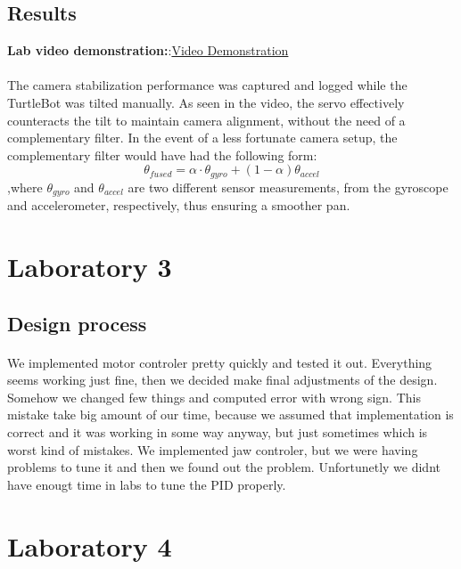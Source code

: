 \documentclass[english]{article}
\begin{document}
    \subsection{Results}
    \textbf{Lab video demonstration:}:\href{https://youtube.com/shorts/imY0JJ4vP6Q?feature=share}{Video Demonstration}
    \paragraph{}
    The camera stabilization performance was captured and logged while the TurtleBot was tilted manually. As seen in the video, the servo effectively counteracts the tilt to maintain camera alignment, without the need of a complementary filter. In the event of a less fortunate camera setup, the complementary filter would have had the following form:
    \begin{equation}
        \theta_{fused} = \alpha \cdot\theta_{gyro} + (1 - \alpha) \theta_{accel}
    \end{equation}
    ,where $\theta_{gyro}$ and $\theta_{accel}$ are two different sensor measurements, from the gyroscope and accelerometer, respectively, thus ensuring a smoother pan.
    

	\section{Laboratory 3}
	\subsection{Design process}
		\paragraph{}
		We implemented motor controler pretty quickly and tested it out. Everything seems working
		just fine, then we decided make final adjustments of the design. Somehow we changed
		few things and computed error with wrong sign. This mistake take big amount of our time, because
		we assumed that implementation is correct and it was working in some way anyway, but just 
		sometimes which is worst kind of mistakes. We implemented jaw controler, but we were having
		problems to tune it and then we found out the problem. Unfortunetly we didnt have enougt time 
		in labs to tune the PID properly.
	\section{Laboratory 4}
\end{document}
